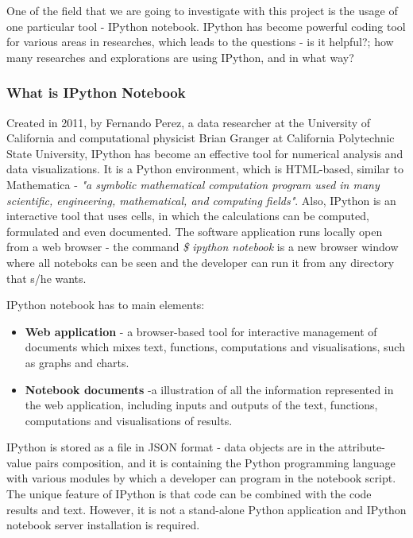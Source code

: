 
One of the field that we are going to investigate with this project is the usage of one particular tool - IPython notebook. IPython has become powerful coding tool for various areas in researches, which leads to the questions - is it helpful?; how many researches and explorations are using IPython, and in what way? 

\subsubsection{What is IPython Notebook}
\label{definition}

Created in 2011, by Fernando Perez, a data researcher at the University of California and computational physicist Brian Granger at California Polytechnic State University, IPython has become an effective tool for numerical analysis and data visualizations.\cite{shen2014interactive} It is a Python environment, which is HTML-based, similar to Mathematica - \textit{"a symbolic mathematical computation program used in many scientific, engineering, mathematical, and computing fields"}. \cite{mathematicaWiki} \cite{mathematicaWolfram} Also, IPython is an interactive tool that uses cells, in which the calculations can be computed, formulated and even documented. The software application runs locally open from a web browser - the command \textit{\$ ipython notebook} is a new browser window where all noteboks can be seen and the developer can run it from any directory that s/he wants.  \cite{johansson2014introduction}

IPython notebook has to main elements:\cite{ipythonFeatures}

\begin{itemize}
\item \textbf{Web application} - a browser-based tool for interactive management of documents which mixes text, functions, computations and visualisations, such as graphs and charts. 
\item \textbf{Notebook documents} -a illustration of all the information represented in the web application, including inputs and outputs of the text, functions, computations and visualisations of results.
\end{itemize}

IPython is stored as a file in JSON format - data objects are in the attribute-value pairs composition, and it is containing the Python programming language with various modules by which a developer can program in the notebook script. The unique feature of IPython is that code can be combined with the code results and text. However, it is not a stand-alone Python application and IPython notebook server installation is required.

